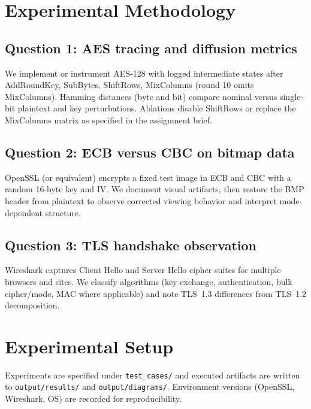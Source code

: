 \section{Experimental Methodology}
\label{sec:experimental-methodology}

\subsection{Question 1: AES tracing and diffusion metrics}
We implement or instrument AES-128 with logged intermediate states after AddRoundKey, SubBytes, ShiftRows, MixColumns (round 10 omits MixColumns). Hamming distances (byte and bit) compare nominal versus single-bit plaintext and key perturbations. Ablations disable ShiftRows or replace the MixColumns matrix as specified in the assignment brief.

\subsection{Question 2: ECB versus CBC on bitmap data}
OpenSSL (or equivalent) encrypts a fixed test image in ECB and CBC with a random 16-byte key and IV. We document visual artifacts, then restore the BMP header from plaintext to observe corrected viewing behavior and interpret mode-dependent structure.

\subsection{Question 3: TLS handshake observation}
Wireshark captures Client Hello and Server Hello cipher suites for multiple browsers and sites. We classify algorithms (key exchange, authentication, bulk cipher/mode, MAC where applicable) and note TLS~1.3 differences from TLS~1.2 decomposition.

\section{Experimental Setup}
\label{sec:experimental-setup}
Experiments are specified under \texttt{test\_cases/} and executed artifacts are written to \texttt{output/results/} and \texttt{output/diagrams/}. Environment versions (OpenSSL, Wireshark, OS) are recorded for reproducibility.
